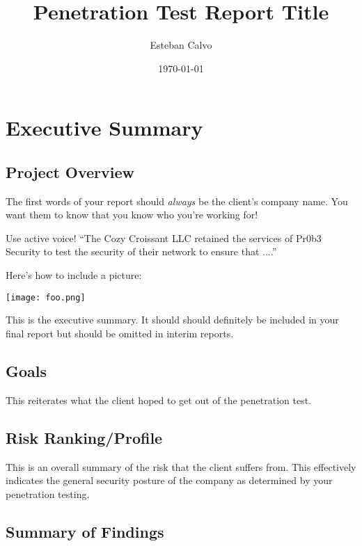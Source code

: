 \documentclass[notitlepage]{article}
\begin{document}
  
\title{Penetration Test Report Title}
\author{Esteban Calvo}
\date{\isodate\today}

\maketitle

\tableofcontents

\newpage
\section{Executive Summary}



\subsection{Project Overview}
The first words of your report should \emph{always} be the client's company name.
You want them to know that you know who you're working for!

Use active voice!
``The Cozy Croissant LLC retained the services of Pr0b3 Security to test the security of their network to ensure that ....''

Here's how to include a picture:

\texttt{[image: foo.png]}

This is the executive summary.
It should should definitely be included in your final report but should be omitted in interim reports.


\subsection{Goals}

This reiterates what the client hoped to get out of the penetration
test.

\subsection{Risk Ranking/Profile}

This is an overall summary of the risk that the client suffers from. This effectively indicates the general security posture of the company as determined by your penetration testing.

\subsection{Summary of Findings}
\end{document}
